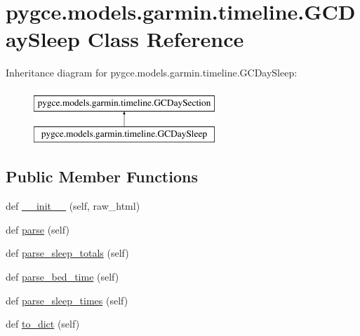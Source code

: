 \hypertarget{classpygce_1_1models_1_1garmin_1_1timeline_1_1_g_c_day_sleep}{}\section{pygce.\+models.\+garmin.\+timeline.\+G\+C\+Day\+Sleep Class Reference}
\label{classpygce_1_1models_1_1garmin_1_1timeline_1_1_g_c_day_sleep}
Inheritance diagram for pygce.\+models.\+garmin.\+timeline.\+G\+C\+Day\+Sleep\+:\begin{figure}[H]
\begin{center}
\leavevmode
\includegraphics[height=2.000000cm]{classpygce_1_1models_1_1garmin_1_1timeline_1_1_g_c_day_sleep}
\end{center}
\end{figure}
\subsection*{Public Member Functions}
\begin{DoxyCompactItemize}
\item 
def \hyperlink{classpygce_1_1models_1_1garmin_1_1timeline_1_1_g_c_day_sleep_a58d1e0c8797955f8d88f1e662dc9ec76}{\+\_\+\+\_\+init\+\_\+\+\_\+} (self, raw\+\_\+html)
\item 
def \hyperlink{classpygce_1_1models_1_1garmin_1_1timeline_1_1_g_c_day_sleep_ad2906beca69f2678a5fb5fc619136039}{parse} (self)
\item 
def \hyperlink{classpygce_1_1models_1_1garmin_1_1timeline_1_1_g_c_day_sleep_aca0d551806aeaaaa7ca5ab55176a1677}{parse\+\_\+sleep\+\_\+totals} (self)
\item 
def \hyperlink{classpygce_1_1models_1_1garmin_1_1timeline_1_1_g_c_day_sleep_a1450b6f36eb2950df8d7b339191e0ac8}{parse\+\_\+bed\+\_\+time} (self)
\item 
def \hyperlink{classpygce_1_1models_1_1garmin_1_1timeline_1_1_g_c_day_sleep_af278bd0696f47ce317fb5e356fc6a438}{parse\+\_\+sleep\+\_\+times} (self)
\item 
def \hyperlink{classpygce_1_1models_1_1garmin_1_1timeline_1_1_g_c_day_sleep_a7ab65a28040de4131099b0479917eb75}{to\+\_\+dict} (self)
\end{DoxyCompactItemize}
